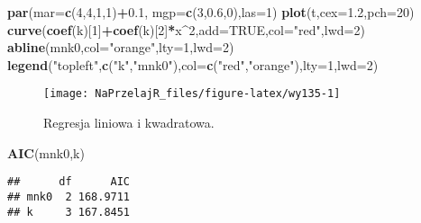 \documentclass[polish,]{book}
\newenvironment{Shaded}{\begin{snugshade}}{\end{snugshade}}
\newcommand{\DataTypeTok}[1]{\textcolor[rgb]{0.13,0.29,0.53}{#1}}
\newcommand{\DecValTok}[1]{\textcolor[rgb]{0.00,0.00,0.81}{#1}}
\newcommand{\FloatTok}[1]{\textcolor[rgb]{0.00,0.00,0.81}{#1}}
\newcommand{\KeywordTok}[1]{\textcolor[rgb]{0.13,0.29,0.53}{\textbf{#1}}}
\newcommand{\NormalTok}[1]{#1}
\newcommand{\OperatorTok}[1]{\textcolor[rgb]{0.81,0.36,0.00}{\textbf{#1}}}
\newcommand{\OtherTok}[1]{\textcolor[rgb]{0.56,0.35,0.01}{#1}}
\newcommand{\StringTok}[1]{\textcolor[rgb]{0.31,0.60,0.02}{#1}}
\begin{document}
\begin{Shaded}
\begin{Highlighting}[]
\KeywordTok{par}\NormalTok{(}\DataTypeTok{mar=}\KeywordTok{c}\NormalTok{(}\DecValTok{4}\NormalTok{,}\DecValTok{4}\NormalTok{,}\DecValTok{1}\NormalTok{,}\DecValTok{1}\NormalTok{)}\OperatorTok{+}\FloatTok{0.1}\NormalTok{, }\DataTypeTok{mgp=}\KeywordTok{c}\NormalTok{(}\DecValTok{3}\NormalTok{,}\FloatTok{0.6}\NormalTok{,}\DecValTok{0}\NormalTok{),}\DataTypeTok{las=}\DecValTok{1}\NormalTok{)}
\KeywordTok{plot}\NormalTok{(t,}\DataTypeTok{cex=}\FloatTok{1.2}\NormalTok{,}\DataTypeTok{pch=}\DecValTok{20}\NormalTok{)}
\KeywordTok{curve}\NormalTok{(}\KeywordTok{coef}\NormalTok{(k)[}\DecValTok{1}\NormalTok{]}\OperatorTok{+}\KeywordTok{coef}\NormalTok{(k)[}\DecValTok{2}\NormalTok{]}\OperatorTok{*}\NormalTok{x}\OperatorTok{^}\DecValTok{2}\NormalTok{,}\DataTypeTok{add=}\OtherTok{TRUE}\NormalTok{,}\DataTypeTok{col=}\StringTok{"red"}\NormalTok{,}\DataTypeTok{lwd=}\DecValTok{2}\NormalTok{)}
\KeywordTok{abline}\NormalTok{(mnk0,}\DataTypeTok{col=}\StringTok{"orange"}\NormalTok{,}\DataTypeTok{lty=}\DecValTok{1}\NormalTok{,}\DataTypeTok{lwd=}\DecValTok{2}\NormalTok{)}
\KeywordTok{legend}\NormalTok{(}\StringTok{"topleft"}\NormalTok{,}\KeywordTok{c}\NormalTok{(}\StringTok{"k"}\NormalTok{,}\StringTok{"mnk0"}\NormalTok{),}\DataTypeTok{col=}\KeywordTok{c}\NormalTok{(}\StringTok{"red"}\NormalTok{,}\StringTok{"orange"}\NormalTok{),}\DataTypeTok{lty=}\DecValTok{1}\NormalTok{,}\DataTypeTok{lwd=}\DecValTok{2}\NormalTok{)}
\end{Highlighting}
\end{Shaded}

\begin{figure}[h]

{\centering \texttt{[image: NaPrzelajR\_files/figure-latex/wy135-1]} 

}

\caption{Regresja liniowa i kwadratowa.}\label{fig:wy135}
\end{figure}

\begin{Shaded}
\begin{Highlighting}[]
\KeywordTok{AIC}\NormalTok{(mnk0,k)}
\end{Highlighting}
\end{Shaded}

\begin{verbatim}
##      df      AIC
## mnk0  2 168.9711
## k     3 167.8451
\end{verbatim}
\end{document}

